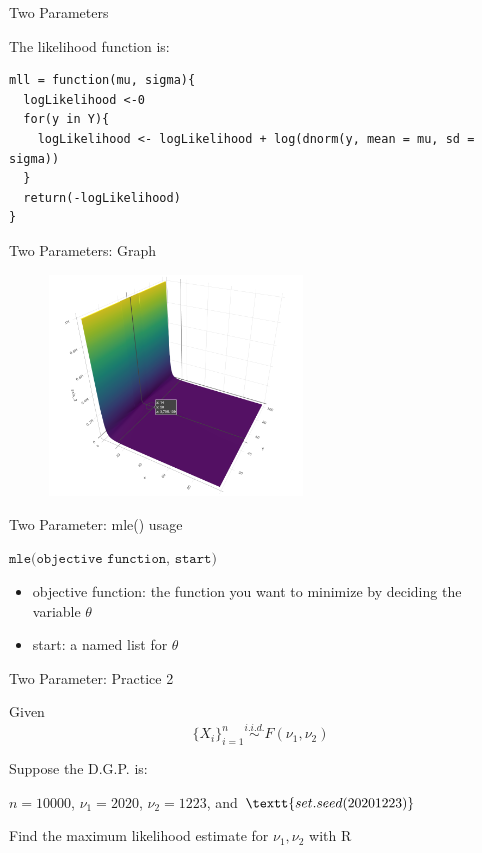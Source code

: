 \documentclass[12pt]{beamer}
\begin{document}
\begin{frame}[fragile]{Two Parameters}

The likelihood function is:

\begin{verbatim}
mll = function(mu, sigma){
  logLikelihood <-0
  for(y in Y){
    logLikelihood <- logLikelihood + log(dnorm(y, mean = mu, sd = sigma))
  }
  return(-logLikelihood)
}
\end{verbatim}

\end{frame}


\begin{frame}[fragile]{Two Parameters: Graph}

	\begin{figure}
		\begin{center}
			\includegraphics[width=0.6\textwidth]{figure/f02.png}
		\end{center}
	\end{figure}

\end{frame}

\begin{frame}[fragile]{Two Parameter: mle() usage}

$\texttt{mle(objective function, start)}$

\begin{itemize}
	\item objective function: the function you want to minimize by deciding the variable $\theta$
	\item start: a named list for $\theta$
\end{itemize}

\end{frame}


\begin{frame}[fragile]{Two Parameter: Practice 2}

Given $$\{X_i\}_{i=1}^n \stackrel{i.i.d.}{\sim} F(\nu_1, \nu_2)$$

Suppose the D.G.P. is:

$n = 10000$, $\nu_1 = 2020$, $\nu_2 = 1223$, and $\textt{set.seed(20201223)}$

Find the maximum likelihood estimate for $\nu_1, \nu_2$ with R

\end{frame}
\end{document}
